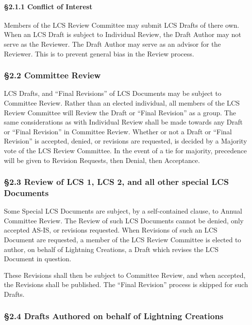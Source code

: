 \paragraph{§2.1.1 Conflict of Interest}\label{conflict-of-interest}

Members of the LCS Review Committee may submit LCS Drafts of there own.
When an LCS Draft is subject to Individual Review, the Draft Author may
not serve as the Reviewer. The Draft Author may serve as an advisor for
the Reviewer. This is to prevent general bias in the Review process.

\subsubsection{§2.2 Committee Review}\label{committee-review}

LCS Drafts, and ``Final Revisions'' of LCS Documents may be subject to
Committee Review. Rather than an elected individual, all members of the
LCS Review Committee will Review the Draft or ``Final Revision'' as a
group. The same considerations as with Individual Review shall be made
towards any Draft or ``Final Revision'' in Committee Review. Whether or
not a Draft or ``Final Revision'' is accepted, denied, or revisions are
requested, is decided by a Majority vote of the LCS Review Committee. In
the event of a tie for majority, precedence will be given to Revision
Requests, then Denial, then Acceptance.

\subsubsection{§2.3 Review of LCS 1, LCS 2, and all other special LCS
Documents}\label{review-of-lcs-1-lcs-2-and-all-other-special-lcs-documents}

Some Special LCS Documents are subject, by a self-contained clause, to
Annual Committee Review. The Review of such LCS Documents cannot be
denied, only accepted AS-IS, or revisions requested. When Revisions of
such an LCS Document are requested, a member of the LCS Review Committee
is elected to author, on behalf of Lightning Creations, a Draft which
revises the LCS Document in question.

These Revisions shall then be subject to Committee Review, and when
accepted, the Revisions shall be published. The ``Final Revision''
process is skipped for such Drafts.

\subsubsection{§2.4 Drafts Authored on behalf of Lightning
Creations}\label{drafts-authored-on-behalf-of-lightning-creations}

